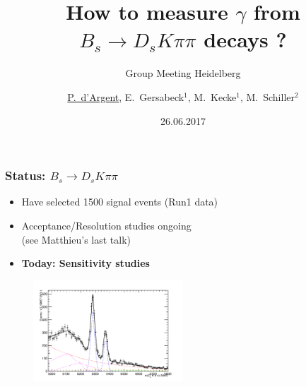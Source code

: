 \documentclass{beamer}
\title[$B_s \to D_s K \pi \pi$]{How to measure $\gamma$ from $B_s \to D_s K \pi \pi$ decays ?}
\subtitle{Group Meeting Heidelberg }
\author[d'Argent ]{\footnotesize \underline{P.~d'Argent}\inst{1}, 
E.~Gersabeck$^1$,
M.~Kecke$^1$,
M.~Schiller$^2$
}
\institute[]{
  \inst{1}%
  Physikalisches Institut Heidelberg
  \and
  \inst{2}%
  University of Glasgow
}
\date{26.06.2017}
\begin{document}
\begin{frame}
	\titlepage
\end{frame}



%
%	
%	
%	

\begin{frame}
	\frametitle{Status: $B_s \to D_s K \pi \pi$}

	\centering
	
	\begin{block}{}
		\begin{itemize}
		\item Have selected 1500 signal events (Run1 data) 
		\item Acceptance/Resolution studies ongoing \\(see Matthieu's last talk)
		\item \bf{Today:} Sensitivity studies
		\end{itemize}
	\end{block}
	
	
	\begin{figure}[hp]
	\centering
		\includegraphics[width=0.5\textwidth, height = !]{plots/BmassFit_sim12.pdf} 	
	\end{figure}				
\end{frame}
\end{document}
